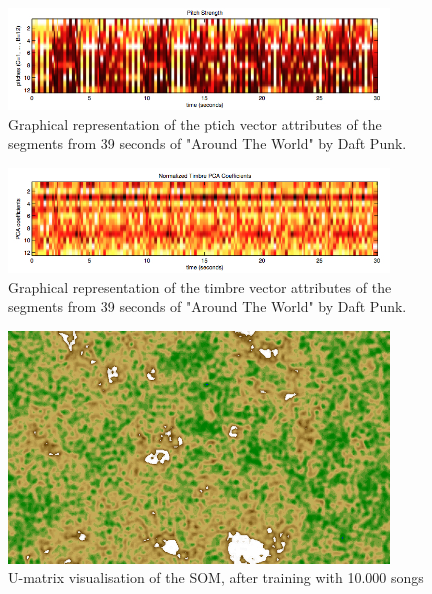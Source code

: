 \begin{figure}[h!]
    \centering
    \includegraphics[width=0.9\textwidth]{figures/pitch.jpg}
    \caption{Graphical representation of the ptich vector attributes of the segments from 39 seconds of "Around The World" by Daft Punk.}
    \label{fig:pitch}
\end{figure}

\begin{figure}[h!]
    \centering
    \includegraphics[width=0.9\textwidth]{figures/timbre.jpg}
    \caption{Graphical representation of the timbre vector attributes of the segments from 39 seconds of "Around The World" by Daft Punk.}
    \label{fig:timbre}
\end{figure}

\begin{figure}[h!]
    \centering
    \includegraphics[angle=90, width=0.9\textwidth]{figures/map.jpg}
    \caption{U-matrix visualisation of the SOM, after training with 10.000 songs}
    \label{fig:map}
\end{figure}

